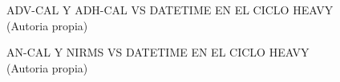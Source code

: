 \begin{figure}[H]
  \hfill
  \hfill
  \hfill
  \caption{ADV-CAL Y ADH-CAL VS DATETIME EN EL CICLO HEAVY (Autoria propia)}
  \end{figure}
\begin{figure}[H]
  \hfill
  \hfill
  \hfill
  \caption{AN-CAL Y NIRMS VS DATETIME EN EL CICLO HEAVY (Autoria propia)}
  \end{figure}
